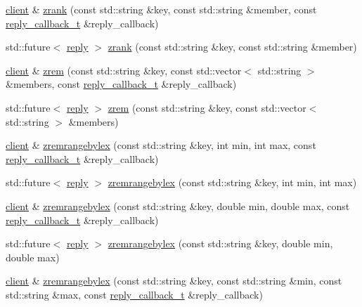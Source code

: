 \begin{DoxyCompactItemize}
\item 
\hyperlink{classcpp__redis_1_1client}{client} \& \hyperlink{classcpp__redis_1_1client_a5563d5240de4bbdbf6ed5dd8cc92a67a}{zrank} (const std\+::string \&key, const std\+::string \&member, const \hyperlink{classcpp__redis_1_1client_a061a1140d36d2eaeda82b09a0bb3f9f2}{reply\+\_\+callback\+\_\+t} \&reply\+\_\+callback)
\item 
std\+::future$<$ \hyperlink{classcpp__redis_1_1reply}{reply} $>$ \hyperlink{classcpp__redis_1_1client_acf680674a3944a3baaa36f888250610e}{zrank} (const std\+::string \&key, const std\+::string \&member)
\item 
\hyperlink{classcpp__redis_1_1client}{client} \& \hyperlink{classcpp__redis_1_1client_ae33a0ea1127a5da870db4354fad2bd10}{zrem} (const std\+::string \&key, const std\+::vector$<$ std\+::string $>$ \&members, const \hyperlink{classcpp__redis_1_1client_a061a1140d36d2eaeda82b09a0bb3f9f2}{reply\+\_\+callback\+\_\+t} \&reply\+\_\+callback)
\item 
std\+::future$<$ \hyperlink{classcpp__redis_1_1reply}{reply} $>$ \hyperlink{classcpp__redis_1_1client_aff2e5ec7005f76869fad79c4e8bd68c8}{zrem} (const std\+::string \&key, const std\+::vector$<$ std\+::string $>$ \&members)
\item 
\hyperlink{classcpp__redis_1_1client}{client} \& \hyperlink{classcpp__redis_1_1client_aff3c4f11d504ba64a98b6bce9bf319a0}{zremrangebylex} (const std\+::string \&key, int min, int max, const \hyperlink{classcpp__redis_1_1client_a061a1140d36d2eaeda82b09a0bb3f9f2}{reply\+\_\+callback\+\_\+t} \&reply\+\_\+callback)
\item 
std\+::future$<$ \hyperlink{classcpp__redis_1_1reply}{reply} $>$ \hyperlink{classcpp__redis_1_1client_a9277ebc759190ce6f085a60a98ad3a7c}{zremrangebylex} (const std\+::string \&key, int min, int max)
\item 
\hyperlink{classcpp__redis_1_1client}{client} \& \hyperlink{classcpp__redis_1_1client_ae03899c0520352eb6a800b9d6c12f2ae}{zremrangebylex} (const std\+::string \&key, double min, double max, const \hyperlink{classcpp__redis_1_1client_a061a1140d36d2eaeda82b09a0bb3f9f2}{reply\+\_\+callback\+\_\+t} \&reply\+\_\+callback)
\item 
std\+::future$<$ \hyperlink{classcpp__redis_1_1reply}{reply} $>$ \hyperlink{classcpp__redis_1_1client_a6ed8333a10d5c4390f3e52f91c436264}{zremrangebylex} (const std\+::string \&key, double min, double max)
\item 
\hyperlink{classcpp__redis_1_1client}{client} \& \hyperlink{classcpp__redis_1_1client_a8fe114da4df2dfd2ab5240554444a294}{zremrangebylex} (const std\+::string \&key, const std\+::string \&min, const std\+::string \&max, const \hyperlink{classcpp__redis_1_1client_a061a1140d36d2eaeda82b09a0bb3f9f2}{reply\+\_\+callback\+\_\+t} \&reply\+\_\+callback)

\end{DoxyCompactItemize}
